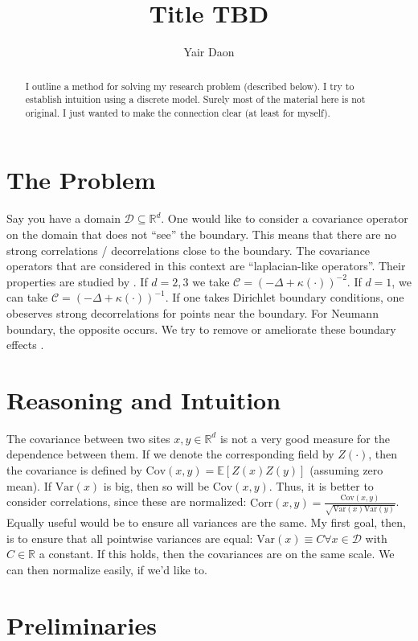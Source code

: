 \documentclass[paper=a4, fontsize=11pt]{scrartcl} %
\title{Title TBD}
\author{Yair Daon}
\date{}
\numberwithin{equation}{section} %
\numberwithin{figure}{section} %
\numberwithin{table}{section} %
\newcommand{\var}{\text{Var}}
\newcommand{\corr}{\text{Corr}}
\newcommand{\dom}{\mathcal{D}}
\newcommand{\cov}{\text{Cov}}
\begin{document}
\maketitle
\begin{abstract}
  I outline a method for solving my research problem (described below). I try to establish intuition
  using a discrete model. Surely most of the material here is not original. I just wanted to make the
  connection clear (at least for myself).
\end{abstract}

\section{The Problem}
Say you have a domain $\dom \subseteq \mathbb{R}^d$. One would like to consider a covariance operator on the domain 
that does not ``see'' the boundary. This means that there are no strong correlations / decorrelations close to
the boundary. The covariance operators that are considered in this context are ``laplacian-like operators''. Their properties
are studied by \cite{stuart2010inverse}.
If $d=2,3$ we take $\mathcal{C} = (-\Delta + \kappa(\cdot) )^{-2}$. If $d=1$, we can take 
$\mathcal{C} = (-\Delta + \kappa(\cdot) )^{-1}$.
If one takes Dirichlet boundary conditions, one obeserves 
strong decorrelations for points near the boundary. For Neumann boundary, the opposite occurs. We try 
to remove or ameliorate these boundary effects \cite{bui2013computational}.

\section{Reasoning and Intuition}
The covariance between two sites $x,y \in \mathbb{R}^d$ is not a very good measure for the dependence 
between them. If we denote the corresponding field by $Z( \cdot )$, then the covariance is 
defined by $\cov (x,y) =\mathbb{E}[Z(x) Z(y)]$ (assuming zero mean). If $\var(x)$ is big,
then so will be $\cov (x,y)$. Thus, it is better to consider correlations, since 
these are normalized: $\corr(x,y) = \frac{\cov (x,y)}{\sqrt{\var(x)\var(y)}}$. Equally useful
would be to ensure all variances are the same. My first goal, then, is to ensure
that all pointwise variances are equal: $\var(x) \equiv C \forall x \in \dom$ with $C \in \mathbb{R}$ a 
constant. If this holds,
then the covariances are on the same scale. We can then normalize easily, if we'd like to.

\section{Preliminaries}
\end{document}

